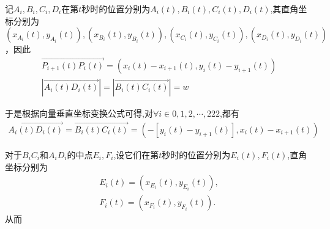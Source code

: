 \documentclass{cumcmthesis}
\begin{document}
 \par 记$A_i,B_i,C_i,D_i$在第$t$秒时的位置分别为$A_i(t),B_i(t),C_i(t),D_i(t)$,其直角坐标分别为$(x_{A_i}(t),y_{A_i}(t)),(x_{B_i}(t),y_{B_i}(t)),(x_{C_i}(t),y_{C_i}(t)),(x_{D_i}(t),y_{D_i}(t))$，因此
 \begin{gather}
 \overrightarrow{P_{i+1}\left( t \right) P_i\left( t \right) }=\left( x_i\left( t \right) -x_{i+1}\left( t \right) ,y_i\left( t \right) -y_{i+1}\left( t \right) \right) \label{problem-2.1}
\\
\left| \overrightarrow{A_i\left( t \right) D_i\left( t \right) } \right|=\left| \overrightarrow{B_i\left( t \right) C_i\left( t \right) } \right|=w\label{problem-2.3}
\end{gather}
\par 于是根据向量垂直坐标变换公式可得,对$\forall i\in {0,1,2,\cdots,222}$,都有
\begin{gather}
\overrightarrow{A_i\left( t \right) D_i\left( t \right) }=\overrightarrow{B_i\left( t \right) C_i\left( t \right) }=\left( -\left[ y_i\left( t \right) -y_{i+1}\left( t \right) \right] ,x_i\left( t \right) -x_{i+1}\left( t \right) \right) \label{problem-2.2}
\end{gather}
 \par 对于$B_iC_i$和$A_iD_i$的中点$E_i,F_i$,设它们在第$t$秒时的位置分别为$E_i(t),F_i(t)$,直角坐标分别为
 \begin{align}
    E_i(t)=(x_{E_i}(t),y_{E_i}(t)),\label{1.........20}
    \\
    F_i(t)=(x_{F_i}(t),y_{F_i}(t)).\label{1.........21}
    \end{align}
    从而
\end{document}
